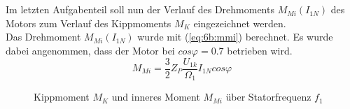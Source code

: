 \section{}
Im letzten Aufgabenteil soll nun der Verlauf des Drehmoments $ M_{Mi}(I_{1N}) $ des Motors zum Verlauf des Kippmoments $ M_{K} $ eingezeichnet werden.\\
Das Drehmoment $ M_{Mi}(I_{1N}) $ wurde mit (\ref{eq:6b:mmi}) berechnet. Es wurde dabei angenommen, dass der Motor bei $ cos\varphi = 0.7 $ betrieben wird. 
\begin{equation}
	M_{Mi} = \frac{3}{2}Z_{P}\frac{U_{1k}}{\Omega_{1}}I_{1N}cos\varphi
	\label{eq:6b:mmi}
\end{equation}
\begin{figure}[h]
	\centering
	
	\caption{Kippmoment $ M_{K} $ und inneres Moment $ M_{Mi} $ über Statorfrequenz $ f_{1} $}
	\label{fig:6c:Momente}
\end{figure}